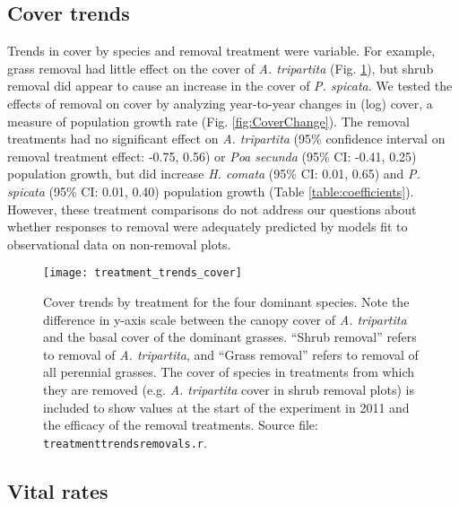 \documentclass[11pt]{article}
\begin{document}
\begin{doublespacing}
\subsection*{Cover trends}

Trends in cover by species and removal treatment were variable. For example, grass removal had little effect on the cover of \textit{A. tripartita} 
(Fig. \ref{fig:CoverTrends}), but shrub removal did appear to cause an increase in the cover of \textit{P. spicata}. 
We tested the effects of removal on cover by analyzing year-to-year changes in (log) cover, a measure of population growth rate (Fig. \ref{fig:CoverChange}). The removal treatments had no significant effect on 
\textit{A. tripartita} (95\% confidence interval on removal treatment effect: -0.75, 0.56) or 
\textit{Poa secunda} (95\% CI: -0.41, 0.25) population growth, but did increase 
\textit{H. comata} (95\% CI: 0.01, 0.65) and
 \textit{P. spicata} (95\% CI: 0.01, 0.40) population growth 
(Table \ref{table:coefficients}). However, these treatment comparisons do not address our questions about whether responses to removal were 
adequately predicted by models fit to observational data on non-removal plots. 

\begin{figure}[tbp]
\centering
\texttt{[image: treatment\_trends\_cover]}
\caption{Cover trends by treatment for the four dominant species.  Note the difference in y-axis scale between the canopy cover of \textit{A. tripartita} and the basal cover of the dominant grasses. ``Shrub removal'' refers to removal of \textit{A. tripartita}, and ``Grass removal'' refers to removal of all perennial grasses. The cover of species in treatments from which they are removed (e.g. \textit{A. tripartita} cover in shrub removal plots) is included to show values at the start of the experiment in 2011 and the efficacy of the removal treatments. Source file: \texttt{treatment\textunderscore trends\textunderscore removals.r}.}
\label{fig:CoverTrends}
\end{figure}


\subsection*{Vital rates}


\end{doublespacing}
\end{document}
